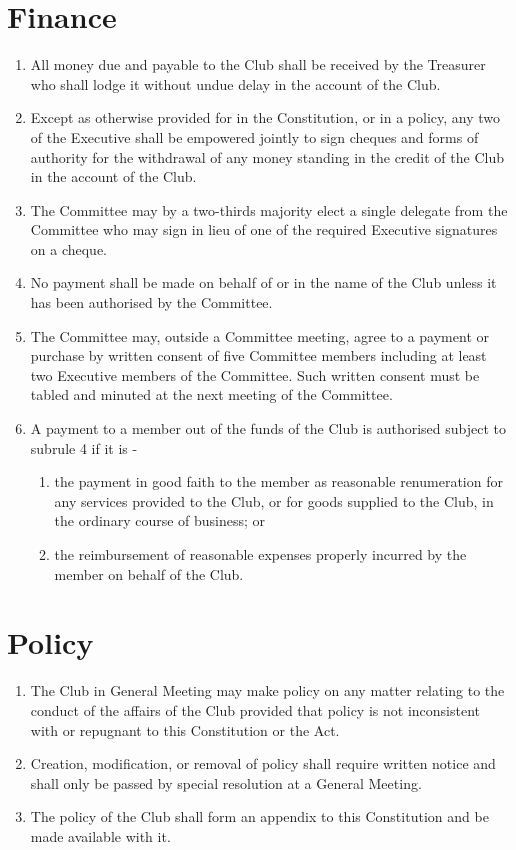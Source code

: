 \documentclass[11pt]{article} %
\begin{document}
\section{Finance}
\begin{enumerate}
	\item All money due and payable to the Club shall be received by the Treasurer who shall lodge it without undue delay in the account of the Club.
	\item Except as otherwise provided for in the Constitution, or in a policy, any two of the Executive shall be empowered jointly to sign cheques and forms of authority for the withdrawal of any money standing in the credit of the Club in the account of the Club.
	\item The Committee may by a two-thirds majority elect a single delegate from the Committee who may sign in lieu of one of the required Executive signatures on a cheque.
	\item No payment shall be made on behalf of or in the name of the Club unless it has been authorised by the Committee.
	\item The Committee may, outside a Committee meeting, agree to a payment or purchase by written consent of five Committee members including at least two Executive members of the Committee. Such written consent must be tabled and minuted at the next meeting of the Committee.
	\item A payment to a member out of the funds of the Club is authorised subject to subrule 4 if it is -
	\begin{enumerate} [1.]
	    \item the payment in good faith to the member as reasonable renumeration for any services provided to the Club, or for goods supplied to the Club, in the ordinary course of business; or
	    \item the reimbursement of reasonable expenses properly incurred by the member on behalf of the Club.
	\end{enumerate}
\end{enumerate}

\section{Policy}
\begin{enumerate}
	\item The Club in General Meeting may make policy on any matter relating to the conduct of the affairs of the Club provided that policy is not inconsistent with or repugnant to this Constitution or the Act.
	\item Creation, modification, or removal of policy shall require written notice and shall only be passed by special resolution at a General Meeting.
	\item The policy of the Club shall form an appendix to this Constitution and be made available with it.
\end{enumerate}
\end{document}
